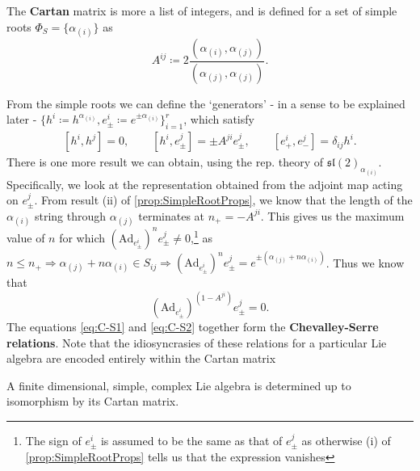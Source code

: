 \documentclass[11pt,fleqn]{article}
\begin{document}
\begin{definition}
	The \textbf{Cartan} matrix is more a list of integers, and is defined for a set of simple roots $\Phi_S = \{ \alpha_{(i)}\}$ as
		\begin{equation}\label{eq:CartanMatrixDef}
			A^{ij} \coloneqq 2 \frac{\left(\alpha_{(i)}, \alpha_{(j)}\right)}{\left(\alpha_{(j)},\alpha_{(j)}\right)}.
		\end{equation}
\end{definition}
\begin{remark}
	From the simple roots we can define the `generators' - in a sense to be explained later - $\{h^i \coloneqq h^{\alpha_{(i)}}, e^i_\pm \coloneqq e^{\pm \alpha_{(i)}}\}_{i=1}^r$, which satisfy
		\begin{align}\label{eq:C-S1}
			[h^i,h^j] = 0, \qquad	[h^i,e_\pm^j] = \pm A^{ji}e^j_\pm, \qquad [e^i_+, e^j_-] = \delta_{ij}h^i.	
		\end{align}
	There is one more result we can obtain, using the rep. theory of $\mathfrak{sl}(2)_{\alpha_{(i)}}$. Specifically, we look at the representation obtained from the adjoint map acting on $e^j_\pm$. From result (ii) of \autoref{prop:SimpleRootProps}, we know that the length of the $\alpha_{(i)}$ string through $\alpha_{(j)}$ terminates at $n_+ = - A^{ji}$. This gives us the maximum value of $n$ for which $( \text{Ad}_{e^i_\pm} )^n e^j_\pm \neq 0$,\footnote{The sign of $e^i_\pm$ is assumed to be the same as that of $e^j_\pm$ as otherwise (i) of \ref{prop:SimpleRootProps} tells us that the expression vanishes} as $n \leq n_+ \Rightarrow \alpha_{(j)} + n \alpha_{(i)} \in S_{ij} \Rightarrow ( \text{Ad}_{e^i_\pm} )^n e^j_\pm = e^{\pm (\alpha_{(j)} + n \alpha_{(i)})}$. Thus we know that
		\begin{equation}\label{eq:C-S2}
			\left( \text{Ad}_{e^i_\pm} \right)^{(1 - A^{ji})} e^j_\pm = 0.
		\end{equation}
	The equations \eqref{eq:C-S1} and \eqref{eq:C-S2} together form the \textbf{Chevalley-Serre relations}. Note that the idiosyncrasies of these relations for a particular Lie algebra are encoded entirely within the Cartan matrix
\end{remark}

\begin{theorem}
	A finite dimensional, simple, complex Lie algebra is determined up to isomorphism by its Cartan matrix.
\end{theorem}
\end{document}
